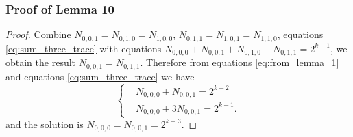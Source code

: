 \documentclass[
    aspectratio=169,                   %
]{beamer}
\newcommand{\F}{\mathbb{F}}
\newcommand{\tr}{\operatorname{tr}_1^k}
\begin{document}
        \begin{frame}
            \frametitle{Proof of Lemma 10}        
        
            \begin{proof}
                
            Combine $ N_{0,0,1}=N_{0,1,0}=N_{1,0,0} $,  $ N_{0,1,1}=N_{1,0,1}=N_{1,1,0} $, equations \eqref{eq:sum_three_trace} with equations $ N_{0,0,0}+N_{0,0,1}+N_{0,1,0}+N_{0,1,1}=2^{k-1} $, 
              we obtain the result $ N_{0,0,1}=N_{0,1,1} $. 
              Therefore from equations \eqref{eq:from_lemma_1} and equations \eqref{eq:sum_three_trace} we have 
              \begin{equation}\left\{\begin{alignedat}{2}
                      &N_{0,0,0}+N_{0,0,1}=2^{k-2}\\
                      &N_{0,0,0}+3N_{0,0,1}=2^{k-1}.
              \end{alignedat}\right.\end{equation}
              and the solution is $ N_{0,0,0}=N_{0,0,1}=2^{k-3} $.
            \end{proof}
        \end{frame}
\end{document}
